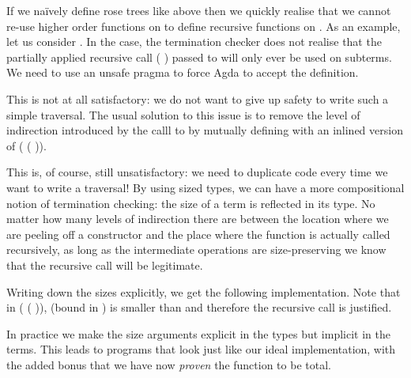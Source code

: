 If we naïvely define rose trees like above then we quickly realise that we cannot
re-use higher order functions on  to define recursive functions on .
As an example, let us consider . In the  case,
the termination checker does not realise that the partially applied recursive call
( ) passed to 
will only ever be used on subterms. We need to use an unsafe  pragma
to force Agda to accept the definition.


This is not at all satisfactory: we do not want to give up safety to write such a
simple traversal. The usual solution to this issue is to remove the level of
indirection introduced by the calll to  by mutually
defining with  an inlined version of
( ( )).


This is, of course, still unsatisfactory: we need to duplicate code every
time we want to write a traversal! By using sized types, we can have a more
compositional notion of termination checking: the size of a term is reflected
in its type. No matter how many levels of indirection there are between the
location where we are peeling off a constructor and the place where the function
is actually called recursively, as long as the intermediate operations are
size-preserving we know that the recursive call will be legitimate.

Writing down the sizes explicitly, we get the following implementation. Note
that in ( (  )),
 (bound in ) is smaller than  and therefore the recursive
call is justified.


In practice we make the size arguments explicit in the types but implicit in the
terms. This leads to programs that look just like our ideal implementation, with
the added bonus that we have now \emph{proven} the function to be total.


